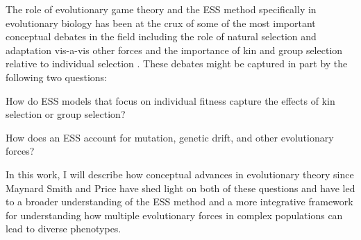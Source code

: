 \documentclass[11pt]{article}
\begin{document}
The role of evolutionary game theory and the ESS method specifically in evolutionary biology has been at the crux of some of the most important conceptual debates in the field including the role of natural selection and adaptation vis-a-vis other forces \cite[e.g.,][]{MaynardSmith:1978,Gould:Lewontin:1979,Lewontin:1979,Orzack:Sober:1994,Gardner:2017,Kern:Hahn:2018,Jensen:Payseur:2019} and the importance of kin and group selection relative to individual selection
\cite[e.g.,][]{Maynard-Smith:1964,Hamilton:1963,Price:1972:cov,Wilson:Wilson:2007,Leigh:2010,Akcay:VanCleve:2012,West:Griffin:2007,Gardner:Grafen:2009,Nowak:Tarnita:2010,Abbot:Abe:2011,Allen:Nowak:2013,Birch:2014,Birch:2017,Nowak:McAvoy:2017}. These debates might be captured in part by the following two questions: \begin{ilnum} \item \label{q:I} How do ESS models that focus on individual fitness capture the effects of kin selection or group selection? \item \label{q:II} How does an ESS account for mutation, genetic drift, and other evolutionary forces? \end{ilnum} In this work, I will describe how conceptual advances in evolutionary theory since Maynard Smith and Price \cite{Maynard-Smith:Price:1973} have shed light on both of these questions and have led to a broader understanding of the ESS method and a more integrative framework for understanding how multiple evolutionary forces in complex populations can lead to diverse phenotypes.
\end{document}
